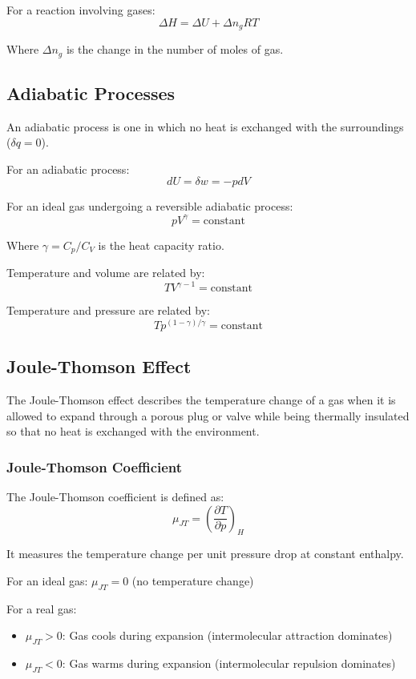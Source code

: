 \documentclass{article}
\theoremstyle{definition}
\begin{document}
For a reaction involving gases:
\[
\Delta H = \Delta U + \Delta n_g RT
\]

Where $\Delta n_g$ is the change in the number of moles of gas.

\subsection{Adiabatic Processes}

An adiabatic process is one in which no heat is exchanged with the surroundings ($\delta q = 0$).

For an adiabatic process:
\[
dU = \delta w = -pdV
\]

For an ideal gas undergoing a reversible adiabatic process:
\[
pV^\gamma = \text{constant}
\]

Where $\gamma = C_p/C_V$ is the heat capacity ratio.

Temperature and volume are related by:
\[
TV^{\gamma-1} = \text{constant}
\]

Temperature and pressure are related by:
\[
T p^{(1-\gamma)/\gamma} = \text{constant}
\]

\subsection{Joule-Thomson Effect}

The Joule-Thomson effect describes the temperature change of a gas when it is allowed to expand through a porous plug or valve while being thermally insulated so that no heat is exchanged with the environment.

\subsubsection{Joule-Thomson Coefficient}

The Joule-Thomson coefficient is defined as:
\[
\mu_{JT} = \left(\frac{\partial T}{\partial p}\right)_H
\]

It measures the temperature change per unit pressure drop at constant enthalpy.

For an ideal gas: $\mu_{JT} = 0$ (no temperature change)

For a real gas:
\begin{itemize}
    \item $\mu_{JT} > 0$: Gas cools during expansion (intermolecular attraction dominates)
    \item $\mu_{JT} < 0$: Gas warms during expansion (intermolecular repulsion dominates)
\end{itemize}
\end{document}
